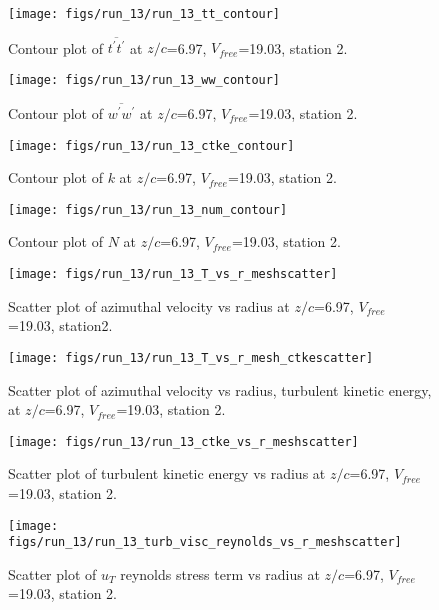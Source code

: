 \begin{figure}[H]
\centering
\texttt{[image: figs/run\_13/run\_13\_tt\_contour]}
\caption{Contour plot of $\overline{t^\prime t^\prime}$ at $z/c$=6.97, $V_{free}$=19.03, station 2.}
\end{figure}


\begin{figure}[H]
\centering
\texttt{[image: figs/run\_13/run\_13\_ww\_contour]}
\caption{Contour plot of $\overline{w^\prime w^\prime}$ at $z/c$=6.97, $V_{free}$=19.03, station 2.}
\end{figure}


\begin{figure}[H]
\centering
\texttt{[image: figs/run\_13/run\_13\_ctke\_contour]}
\caption{Contour plot of $k$ at $z/c$=6.97, $V_{free}$=19.03, station 2.}
\end{figure}


\begin{figure}[H]
\centering
\texttt{[image: figs/run\_13/run\_13\_num\_contour]}
\caption{Contour plot of $N$ at $z/c$=6.97, $V_{free}$=19.03, station 2.}
\end{figure}


\begin{figure}[H]
\centering
\texttt{[image: figs/run\_13/run\_13\_T\_vs\_r\_meshscatter]}
\caption{Scatter plot of azimuthal velocity vs radius at $z/c$=6.97, $V_{free}$=19.03, station2.}
\end{figure}


\begin{figure}[H]
\centering
\texttt{[image: figs/run\_13/run\_13\_T\_vs\_r\_mesh\_ctkescatter]}
\caption{Scatter plot of azimuthal velocity vs radius, turbulent kinetic energy, at $z/c$=6.97, $V_{free}$=19.03, station 2.}
\end{figure}


\begin{figure}[H]
\centering
\texttt{[image: figs/run\_13/run\_13\_ctke\_vs\_r\_meshscatter]}
\caption{Scatter plot of turbulent kinetic energy vs radius at $z/c$=6.97, $V_{free}$=19.03, station 2.}
\end{figure}


\begin{figure}[H]
\centering
\texttt{[image: figs/run\_13/run\_13\_turb\_visc\_reynolds\_vs\_r\_meshscatter]}
\caption{Scatter plot of $
u_T$ reynolds stress term vs radius at $z/c$=6.97, $V_{free}$=19.03, station 2.}
\end{figure}



